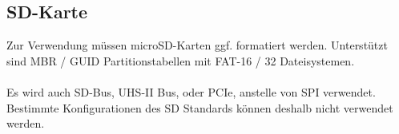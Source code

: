 \documentclass[ngerman]{schoolPres}
\begin{document}
\begin{frame}
  \end{frame}

  \subsection{SD-Karte}%
  \begin{frame}
    Zur Verwendung müssen microSD-Karten ggf. formatiert werden.
    Unterstützt sind MBR / GUID Partitionstabellen mit FAT-16 / 32 Dateisystemen\cite{sd-lib}.\\~\\

    Es wird auch SD-Bus, UHS-II Bus, oder PCIe, anstelle von SPI verwendet.
    Bestimmte Konfigurationen des SD Standards können deshalb nicht verwendet werden\cite{sd-spec_physical-layer}.

  \end{frame}
\end{document}
